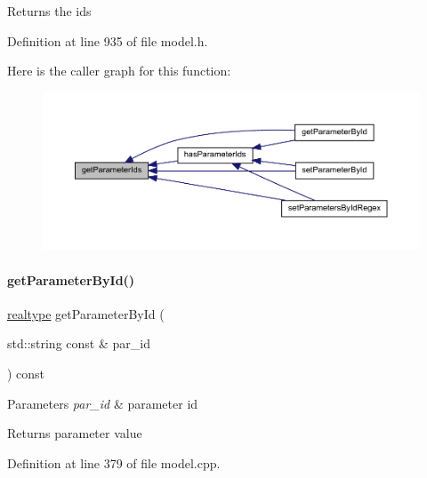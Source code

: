 \begin{DoxyReturn}{Returns}
the ids 
\end{DoxyReturn}


Definition at line 935 of file model.\+h.

Here is the caller graph for this function\+:
\nopagebreak
\begin{figure}[H]
\begin{center}
\leavevmode
\includegraphics[width=350pt]{classamici_1_1_model_ad5647cbe7c4989a7692955cbdbf5b3cd_icgraph}
\end{center}
\end{figure}
\mbox{\label{classamici_1_1_model_a4436bd89ae2cb032cbf13db478d99e15}} 
\paragraph{\texorpdfstring{get\+Parameter\+By\+Id()}{getParameterById()}}
{\footnotesize\ttfamily \mbox{\hyperlink{namespaceamici_a1bdce28051d6a53868f7ccbf5f2c14a3}{realtype}} get\+Parameter\+By\+Id (\begin{DoxyParamCaption}\item[{std\+::string const \&}]{par\+\_\+id }\end{DoxyParamCaption}) const}


\begin{DoxyParams}{Parameters}
{\em par\+\_\+id} & parameter id \\
\hline
\end{DoxyParams}
\begin{DoxyReturn}{Returns}
parameter value 
\end{DoxyReturn}


Definition at line 379 of file model.\+cpp.

